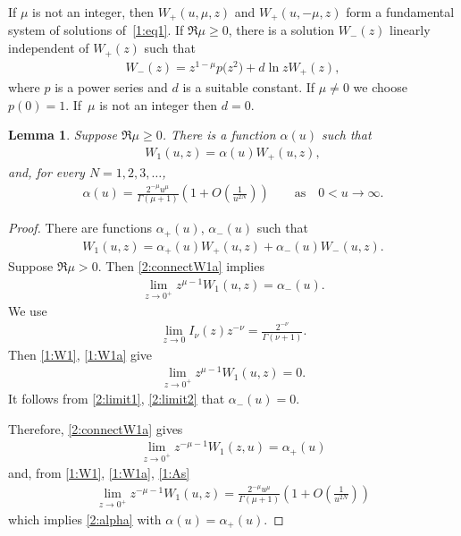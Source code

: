 \documentclass[11pt]{article}
\numberwithin{equation}{section}
\newtheorem{Lemma}[Theorem]{Lemma}
{ \theoremstyle{definition}
\newtheorem{Remarks}[Theorem]{Remarks} }
\begin{document}
If $\mu$ is not an integer, then $W_+(u,\mu,z)$ and $W_+(u,-\mu,z)$ form a fundamental system of solutions of~\eqref{1:eq1}.
If $\Re \mu\ge 0$, there is a solution $W_-(z)$ linearly independent of $W_+(z)$ such that
\begin{gather*}%
W_-(z)=z^{1-\mu}p\big(z^2\big)+ d \ln z W_+(z),
\end{gather*}
where $p$ is a power series and $d$ is a suitable constant. If $\mu\ne 0$ we choose $p(0)=1$. If~$\mu$ is not an integer then $d=0$.

\begin{Lemma}\label{2:l1}
Suppose $\Re\mu\ge 0$.
There is a function $\alpha(u)$ such that
\begin{gather*}%
W_1(u,z)=\alpha(u)W_+(u,z),
\end{gather*}
and, for every $N=1,2,3,\dots$,
\begin{gather}\label{2:alpha}
\alpha(u)=\frac{2^{-\mu}u^\mu}{\Gamma(\mu+1)}\left(1+O\left(\frac1{u^{2N}}\right)\right)\qquad\text{as} \quad 0<u\to\infty.
\end{gather}
\end{Lemma}

\begin{proof}
There are functions $\alpha_+(u)$, $\alpha_-(u)$ such that
\begin{gather}\label{2:connectW1a}
W_1(u,z)=\alpha_+(u)W_+(u,z)+\alpha_-(u)W_-(u,z).
\end{gather}
Suppose $\Re\mu>0$. Then \eqref{2:connectW1a} implies
\begin{gather}\label{2:limit1}
\lim_{z\to0^+} z^{\mu-1}W_1(u,z)=\alpha_-(u).
\end{gather}
We use \cite[(10.30.1)]{NIST}
\begin{gather*}%
 \lim_{z\to0} I_\nu(z)z^{-\nu}=\frac{2^{-\nu}}{\Gamma(\nu+1)}.
\end{gather*}
Then \eqref{1:W1}, \eqref{1:W1a} give{\samepage
\begin{gather}\label{2:limit2}
\lim_{z\to0^+} z^{\mu-1}W_1(u,z)= 0.
\end{gather}
It follows from \eqref{2:limit1}, \eqref{2:limit2} that $\alpha_-(u)=0$.}

\setcounter{section}{3}
\setcounter{subsection}{0}
\setcounter{subsubsection}{0}
\setcounter{Theorem}{1}
\setcounter{equation}{4}
Therefore, \eqref{2:connectW1a} gives
\begin{gather*} \lim_{z\to0^+} z^{-\mu-1} W_1(z,u)=\alpha_+(u)\end{gather*}
and, from \eqref{1:W1}, \eqref{1:W1a}, \eqref{1:As}
\begin{gather*} \lim_{z\to0^+} z^{-\mu-1}W_1(u,z)=\frac{2^{-\mu}u^\mu}{\Gamma(\mu+1)}\left(1+O\left(\frac1{u^{2N}}\right)\right)\end{gather*}
which implies \eqref{2:alpha} with $\alpha(u)=\alpha_+(u)$.
\end{proof}
\end{document}

